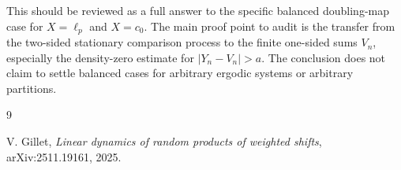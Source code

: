 \documentclass[11pt]{article}
\begin{document}
This should be reviewed as a full answer to the specific balanced
doubling-map case for \(X=\ell_p\) and \(X=c_0\).  The main proof point to
audit is the transfer from the two-sided stationary comparison process to the
finite one-sided sums \(V_n\), especially the density-zero estimate for
\(|Y_n-V_n|>a\).  The conclusion does not claim to settle balanced cases for
arbitrary ergodic systems or arbitrary partitions.

\begin{thebibliography}{9}

V. Gillet,
\emph{Linear dynamics of random products of weighted shifts},
arXiv:2511.19161, 2025.

\end{thebibliography}
\end{document}
